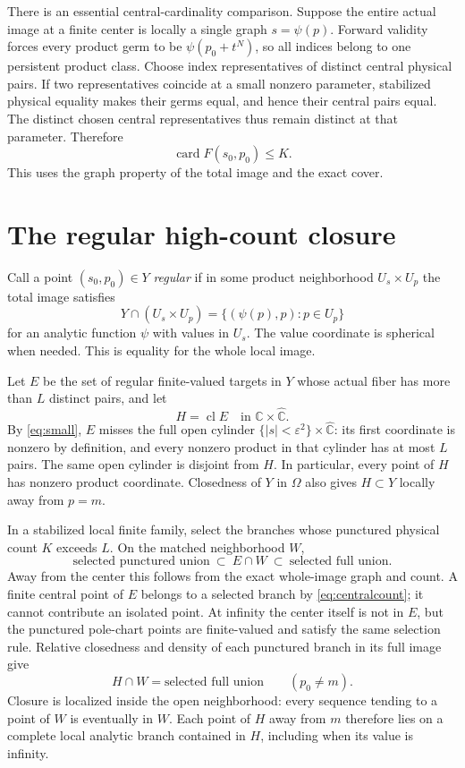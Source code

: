 \documentclass[11pt]{article}
\numberwithin{equation}{section}
\newcommand{\C}{\mathbb C}
\newcommand{\Chat}{\widehat{\C}}
\newcommand{\card}{\operatorname{card}}
\newcommand{\cl}{\operatorname{cl}}
\begin{document}
There is an essential central-cardinality comparison. Suppose the entire
actual image at a finite center is locally a single graph $s=\psi(p)$.
Forward validity forces every product germ to be $\psi(p_0+t^N)$, so all
indices belong to one persistent product class. Choose index representatives
of distinct central physical pairs. If two representatives coincide at a
small nonzero parameter, stabilized physical equality makes their germs
equal, and hence their central pairs equal. The distinct chosen central
representatives thus remain distinct at that parameter. Therefore
\begin{equation}\label{eq:centralcount}
 \card F(s_0,p_0)\le K.
\end{equation}
This uses the graph property of the total image and the exact cover.

\section{The regular high-count closure}\label{sec:high-count}

Call a point $(s_0,p_0)\in Y$ \emph{regular} if in some product
neighborhood $U_s\times U_p$ the total image satisfies
\[
 Y\cap(U_s\times U_p)=\{(\psi(p),p):p\in U_p\}
\]
for an analytic function $\psi$ with values in $U_s$. The value coordinate
is spherical when needed. This is equality for the whole local image.

Let $E$ be the set of regular finite-valued targets in $Y$ whose actual
fiber has more than $L$ distinct pairs, and let
\[
 H=\cl E\quad\text{in }\C\times\Chat.
\]
By \eqref{eq:small}, $E$ misses the full open cylinder
$\{|s|<\varepsilon^2\}\times\Chat$: its first coordinate is nonzero by
definition, and every nonzero product in that cylinder has at most $L$
pairs. The same open cylinder is disjoint from $H$. In particular, every
point of $H$ has nonzero product coordinate. Closedness of $Y$ in $\Omega$
also gives $H\subset Y$ locally away from $p=m$.

In a stabilized local finite family, select the branches whose punctured
physical count $K$ exceeds $L$. On the matched neighborhood $W$,
\[
 \text{selected punctured union}\ \subset\ E\cap W\
 \subset\ \text{selected full union}.
\]
Away from the center this follows from the exact whole-image graph and
count. A finite central point of $E$ belongs to a selected branch by
\eqref{eq:centralcount}; it cannot contribute an isolated point.
At infinity the center itself is not in $E$, but the punctured pole-chart
points are finite-valued and satisfy the same selection rule.
Relative closedness and density of each punctured branch in its full
image give
\begin{equation}\label{eq:interiorH}
 H\cap W=\text{selected full union}\qquad(p_0\ne m).
\end{equation}
Closure is localized inside the open neighborhood: every sequence tending
to a point of $W$ is eventually in $W$. Each point of $H$ away from $m$
therefore lies on a complete local analytic branch contained in $H$,
including when its value is infinity.
\end{document}
